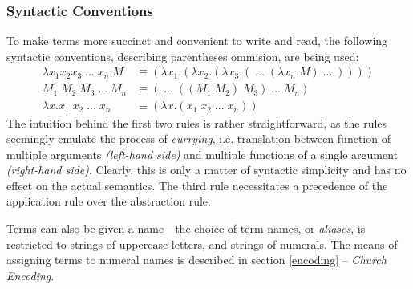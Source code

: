 \documentclass[a4paper,10pt]{article}
\begin{document}
\subsubsection{Syntactic Conventions} \label{sec:conventions}
To make terms more succinct and convenient to write and read, the 
following syntactic conventions, describing parentheses ommision, are being used:
\begin{align*}
	\lambda x_1 x_2 x_3\;...\;x_n.M &\equiv (\lambda x_1.(\lambda x_2.(\lambda x_3.(\;...\;(\lambda x_n.M)\;...\;))))\\
	M_1\;M_2\;M_3\;...\;M_n &\equiv (\;...\;((M_1\;M_2)\;M_3)\;...\;M_n)\\
	\lambda x.x_1\;x_2\;...\;x_n &\equiv (\lambda x.(x_1\;x_2\;...\;x_n))
\end{align*}
The intuition behind the first two rules is rather straightforward, as the rules
seemingly emulate the process of \textit{currying}, i.e.
translation between function of multiple arguments \textit{(left-hand side)} and multiple
functions of a single argument \textit{(right-hand side)}. Clearly, this is only
a matter of syntactic simplicity and has no effect on the actual semantics.
The third rule necessitates a precedence of the application rule over the abstraction rule.

Terms can also be given a name---the choice of term names, or \textit{aliases}, is restricted to 
strings of uppercase letters, and strings of numerals.
The means of assigning terms to numeral names is described in section \ref{encoding} -- \textit{Church Encoding}.
\end{document}
